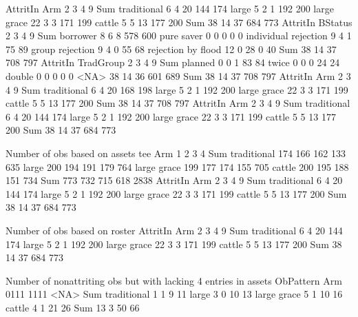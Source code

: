 \begin{Schunk}
\begin{Soutput}
             AttritIn
Arm             2   3   4   9 Sum
  traditional   6   4  20 144 174
  large         5   2   1 192 200
  large grace  22   3   3 171 199
  cattle        5   5  13 177 200
  Sum          38  14  37 684 773
                      AttritIn
BStatus                  2   3   4   9 Sum
  borrower               8   6   8 578 600
  pure saver             0   0   0   0   0
  individual rejection   9   4   1  75  89
  group rejection        9   4   0  55  68
  rejection by flood    12   0  28   0  40
  Sum                   38  14  37 708 797
         AttritIn
TradGroup   2   3   4   9 Sum
  planned   0   0   1  83  84
  twice     0   0   0  24  24
  double    0   0   0   0   0
  <NA>     38  14  36 601 689
  Sum      38  14  37 708 797
             AttritIn
Arm             2   3   4   9 Sum
  traditional   6   4  20 168 198
  large         5   2   1 192 200
  large grace  22   3   3 171 199
  cattle        5   5  13 177 200
  Sum          38  14  37 708 797
             AttritIn
Arm             2   3   4   9 Sum
  traditional   6   4  20 144 174
  large         5   2   1 192 200
  large grace  22   3   3 171 199
  cattle        5   5  13 177 200
  Sum          38  14  37 684 773


Number of obs based on assets
             tee
Arm              1    2    3    4  Sum
  traditional  174  166  162  133  635
  large        200  194  191  179  764
  large grace  199  177  174  155  705
  cattle       200  195  188  151  734
  Sum          773  732  715  618 2838
             AttritIn
Arm             2   3   4   9 Sum
  traditional   6   4  20 144 174
  large         5   2   1 192 200
  large grace  22   3   3 171 199
  cattle        5   5  13 177 200
  Sum          38  14  37 684 773


Number of obs based on roster
             AttritIn
Arm             2   3   4   9 Sum
  traditional   6   4  20 144 174
  large         5   2   1 192 200
  large grace  22   3   3 171 199
  cattle        5   5  13 177 200
  Sum          38  14  37 684 773


Number of nonattriting obs but with lacking 4 entries in assets
             ObPattern
Arm           0111 1111 <NA> Sum
  traditional    1    1    9  11
  large          3    0   10  13
  large grace    5    1   10  16
  cattle         4    1   21  26
  Sum           13    3   50  66
\end{Soutput}
\end{Schunk}











